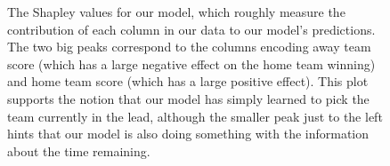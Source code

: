 \begin{figure}
	\centering
	
	\caption{The Shapley values for our model, which roughly measure the contribution of each column in our data to our model's predictions. The two big peaks correspond to the columns encoding away team score (which has a large negative effect on the home team winning) and home team score (which has a large positive effect). This plot supports the notion that our model has simply learned to pick the team currently in the lead, although the smaller peak just to the left hints that our model is also doing something with the information about the time remaining.}
	\label{fig:model-shap-values}
\end{figure}

